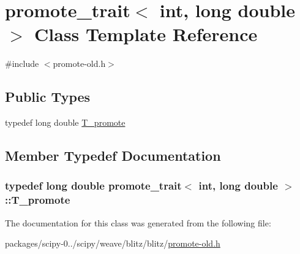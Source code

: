 \hypertarget{classpromote__trait_3_01int_00_01long_01double_01_4}{}\section{promote\+\_\+trait$<$ int, long double $>$ Class Template Reference}
\label{classpromote__trait_3_01int_00_01long_01double_01_4}


{\ttfamily \#include $<$promote-\/old.\+h$>$}

\subsection*{Public Types}
\begin{DoxyCompactItemize}
\item 
typedef long double \hyperlink{classpromote__trait_3_01int_00_01long_01double_01_4_aee07c916a692cc14236807ba1f560f85}{T\+\_\+promote}
\end{DoxyCompactItemize}


\subsection{Member Typedef Documentation}
\hypertarget{classpromote__trait_3_01int_00_01long_01double_01_4_aee07c916a692cc14236807ba1f560f85}{}
\subsubsection[{T\+\_\+promote}]{\setlength{\rightskip}{0pt plus 5cm}typedef long double {\bf promote\+\_\+trait}$<$ int, long double $>$\+::{\bf T\+\_\+promote}}\label{classpromote__trait_3_01int_00_01long_01double_01_4_aee07c916a692cc14236807ba1f560f85}


The documentation for this class was generated from the following file\+:\begin{DoxyCompactItemize}
\item 
packages/scipy-\/0../scipy/weave/blitz/blitz/\hyperlink{promote-old_8h}{promote-\/old.\+h}\end{DoxyCompactItemize}
